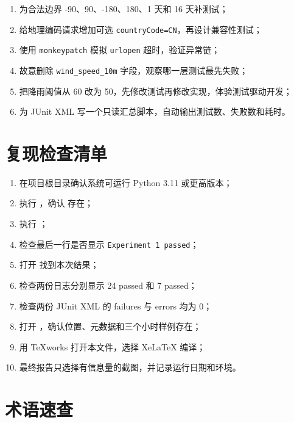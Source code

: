 \documentclass[UTF8,zihao=-4,a4paper]{ctexart}
\newcommand{\code}[1]{\texttt{#1}}
\begin{document}
\begin{enumerate}
  \item 为合法边界 -90、90、-180、180、1 天和 16 天补测试；
  \item 给地理编码请求增加可选 \code{countryCode=CN}，再设计兼容性测试；
  \item 使用 \code{monkeypatch} 模拟 \code{urlopen} 超时，验证异常链；
  \item 故意删除 \code{wind\_speed\_10m} 字段，观察哪一层测试最先失败；
  \item 把降雨阈值从 60 改为 50，先修改测试再修改实现，体验测试驱动开发；
  \item 为 JUnit XML 写一个只读汇总脚本，自动输出测试数、失败数和耗时。
\end{enumerate}

\section{复现检查清单}

\begin{enumerate}[label=$\square$]
  \item 在项目根目录确认系统可运行 Python 3.11 或更高版本；
  \item 执行 ，确认  存在；
  \item 执行 ；
  \item 检查最后一行是否显示 \code{Experiment 1 passed}；
  \item 打开  找到本次结果；
  \item 检查两份日志分别显示 24 passed 和 7 passed；
  \item 检查两份 JUnit XML 的 failures 与 errors 均为 0；
  \item 打开 ，确认位置、元数据和三个小时样例存在；
  \item 用 TeXworks 打开本文件，选择 XeLaTeX 编译；
  \item 最终报告只选择有信息量的截图，并记录运行日期和环境。
\end{enumerate}

\section{术语速查}
\end{document}
